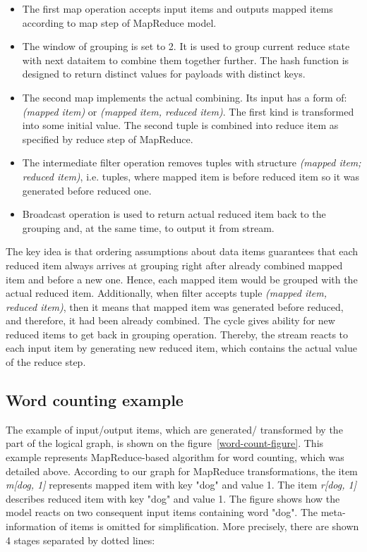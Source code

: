 \begin{itemize}
\item The first map operation accepts input items and outputs mapped items according to map step of MapReduce model.
\item The window of grouping is set to 2. It is used to group current reduce state with next dataitem to combine them together further. The hash function is designed to return distinct values for payloads with distinct keys.
\item The second map implements the actual combining. Its input has a form of: \textit{(mapped item)} or \textit{(mapped item, reduced item)}. The first kind is transformed into some initial value. The second tuple is combined into reduce item as specified by reduce step of MapReduce. 
\item The intermediate filter operation removes tuples with structure \textit{(mapped item; reduced item)}, i.e. tuples, where mapped item is before reduced item so it was generated before reduced one.
\item Broadcast operation is used to return actual reduced item back to the grouping and, at the same time, to output it from stream. 
\end{itemize}

The key idea is that ordering assumptions about data items guarantees that each reduced item always arrives at grouping right after already combined mapped item and before a new one. Hence, each mapped item would be grouped with the actual reduced item. Additionally, when filter accepts tuple {\it (mapped item, reduced item)}, then it means that mapped item was generated before reduced, and therefore, it had been already combined. The cycle gives ability for new reduced items to get back in grouping operation. Thereby, the stream reacts to each input item by generating new reduced item, which contains the actual value of the reduce step.

\subsection{Word counting example}

The example of input/output items, which are generated/ transformed by the part of the logical graph, is shown on the figure~\ref {word-count-figure}. This example represents MapReduce-based algorithm for word counting, which was detailed above. According to our graph for MapReduce transformations, the item {\it m[dog, 1]} represents mapped item with key "dog" and value 1. The item {\it r[dog, 1]} describes reduced item with key "dog" and value 1. The figure shows how the model reacts on two consequent input items containing word "dog". The meta-information of items is omitted for simplification. More precisely, there are shown 4 stages separated by dotted lines:

